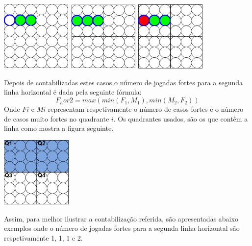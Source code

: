 \begin{table}[H]
\centering
\includegraphics[height=3.5cm]{images/h12_VS.jpg}
\includegraphics[height=3.5cm]{images/h12_VS2.jpg}
\includegraphics[height=3.5cm]{images/h12_S.jpg}
\end{table}

Depois de contabilizadas estes casos o número de jogadas fortes para a segunda linha horizontal é dada pela seguinte fórmula:
\begin{equation}
F_hor2 = max( min(F_1,M_1) , min(M_2,F_2) )
\end{equation}
Onde $Fi$ e $Mi$ representam respetivamente o número de casos fortes e o número de casos muito fortes no quadrante $i$. Os quadrantes usados, são os que contêm a linha como mostra a figura seguinte.

\begin{table}[H]
\centering
\includegraphics[height=3.5cm]{images/boardsQuadrants.jpg}
\end{table}

Assim, para melhor ilustrar a contabilização referida, são apresentadas abaixo exemplos onde o número de jogadas fortes para a segunda linha horizontal são respetivamente 1, 1, 1 e 2.

